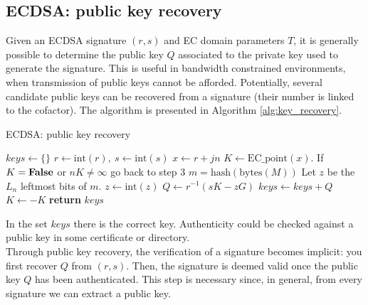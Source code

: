 \subsection{ECDSA: public key recovery}
Given an ECDSA signature $(r, s)$ and EC domain parameters $T$, it is generally possible to determine the public key $Q$ associated to the private key used to generate the signature. This is useful in bandwidth constrained environments, when transmission of public keys cannot be afforded. Potentially, several candidate public keys can be recovered from a signature (their number is linked to the cofactor). The algorithm is presented in Algorithm \ref{alg:key_recovery}.

\begin{algorithm}
	\caption{ECDSA: public key recovery}
	\label{alg:key_recovery}
	\begin{algorithmic}[1]
		\State $keys \gets \{\}$
		\State $r \gets \text{int}(r), \ s \gets \text{int}(s)$
		\State $x \gets r + jn$
		\State $K \gets \text{EC\_point}(x)$. If $K = {\bf False}$ or $nK \neq \infty$ go back to step 3
		\State $m = \text{hash}(\text{bytes}(M))$
		\State Let $z$ be the $L_n$ leftmost bits of $m$. $z \gets \text{int}(z)$
		\State $Q \gets r^{-1}(sK - zG)$
		\State $keys \gets keys + Q$
		\State $K \gets -K$
		\EndFor
		\EndFor
		\State \textbf{return} $keys$
		\EndProcedure
	\end{algorithmic}
\end{algorithm}
\noindent
In the set $keys$ there is the correct key. Authenticity could be checked against a public key in some certificate or directory.
\\
Through public key recovery, the verification of a signature becomes implicit: you first recover $Q$ from $(r, s)$. Then, the signature is deemed valid once the public key $Q$ has been authenticated. This step is necessary since, in general, from every signature we can extract a public key.

\bigskip

\bigskip

